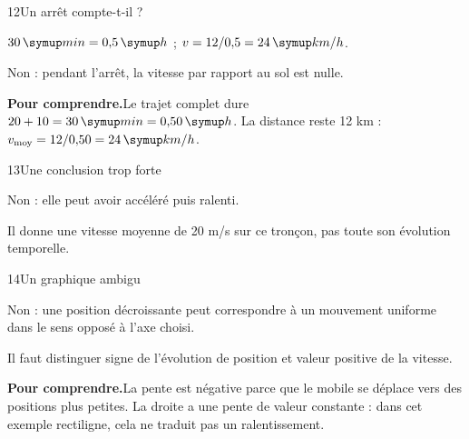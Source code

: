 \par\noindent\begin{minipage}{\linewidth}
\begin{corrige}{12}{Un arrêt compte-t-il ?}
\begin{questions}
\item $30\unite{min}=0{,}5\unite h$ ; $v=12/0{,}5=24\unite{km/h}$.
\item Non : pendant l’arrêt, la vitesse par rapport au sol est nulle.
\end{questions}
\par\smallskip\noindent\textbf{Pour comprendre.}\enspace Le trajet complet dure $20+10=30\unite{min}=0{,}50\unite h$. La distance reste 12 km : $v_{\rm moy}=12/0{,}50=24\unite{km/h}$.\par
{}
\end{corrige}
\end{minipage}
\par\noindent\begin{minipage}{\linewidth}
\begin{corrige}{13}{Une conclusion trop forte}
\begin{questions}
\item Non : elle peut avoir accéléré puis ralenti.
\item Il donne une vitesse moyenne de 20 m/s sur ce tronçon, pas toute son évolution temporelle.
\end{questions}
\end{corrige}
\end{minipage}
\par\noindent\begin{minipage}{\linewidth}
\begin{corrige}{14}{Un graphique ambigu}
\begin{questions}
\item Non : une position décroissante peut correspondre à un mouvement uniforme dans le sens opposé à l’axe choisi.
\item Il faut distinguer signe de l’évolution de position et valeur positive de la vitesse.
\end{questions}
\par\smallskip\noindent\textbf{Pour comprendre.}\enspace La pente est négative parce que le mobile se déplace vers des positions plus petites. La droite a une pente de valeur constante : dans cet exemple rectiligne, cela ne traduit pas un ralentissement.\par
{}
\end{corrige}
\end{minipage}
